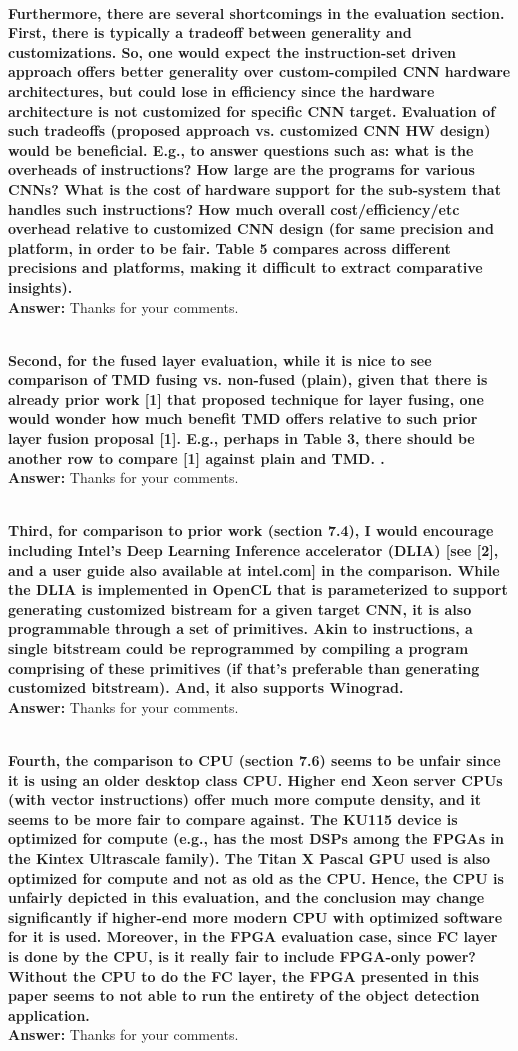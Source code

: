 \documentclass[12pt]{paper}
\newcommand{\rev}[1]{{{\color[rgb]{0,0,1}{#1}}}}
\newcommand{\answer}[1]{\noindent\textbf{Answer:} #1}
\newcommand{\comment}[1]{\noindent\textbf{\\ #1}\\}
\begin{document}
\comment{Furthermore, there are several shortcomings in the evaluation section. \\
First, there is typically a tradeoff between generality and customizations. So, one would expect the instruction-set driven approach offers better generality over custom-compiled CNN hardware architectures, but could lose in efficiency since the hardware architecture is not customized for specific CNN target. Evaluation of such tradeoffs (proposed approach vs. customized CNN HW design) would be beneficial. E.g., to answer questions such as: what is the overheads of instructions? How large are the programs for various CNNs? What is the cost of hardware support for the sub-system that handles such instructions? How much overall cost/efficiency/etc overhead relative to customized CNN design (for same precision and platform, in order to be fair. Table 5 compares across different precisions and platforms, making it difficult to extract comparative insights). 
}
\answer{Thanks for your comments.}
\rev{We have corrected this error.}

\comment{Second, for the fused layer evaluation, while it is nice to see comparison of TMD fusing vs. non-fused (plain), given that there is already prior work [1] that proposed technique for layer fusing, one would wonder how much benefit TMD offers relative to such prior layer fusion proposal [1]. E.g., perhaps in Table 3, there should be another row to compare [1] against plain and TMD. . 
}
\answer{Thanks for your comments.}
\rev{We have corrected this error.}

\comment{Third, for comparison to prior work (section 7.4), I would encourage including Intel’s Deep Learning Inference accelerator (DLIA) [see [2], and a user guide also available at intel.com] in the comparison. While the DLIA is implemented in OpenCL that is parameterized to support generating customized bistream for a given target CNN, it is also programmable through a set of primitives. Akin to instructions, a single bitstream could be reprogrammed by compiling a program comprising of these primitives (if that’s preferable than generating customized bitstream). And, it also supports Winograd. 
}
\answer{Thanks for your comments.}
\rev{We have corrected this error.}

\comment{Fourth, the comparison to CPU (section 7.6) seems to be unfair since it is using an older desktop class CPU. Higher end Xeon server CPUs (with vector instructions) offer much more compute density, and it seems to be more fair to compare against. The KU115 device is optimized for compute (e.g., has the most DSPs among the FPGAs in the Kintex Ultrascale family). The Titan X Pascal GPU used is also optimized for compute and not as old as the CPU. Hence, the CPU is unfairly depicted in this evaluation, and the conclusion may change significantly if higher-end more modern CPU with optimized software for it is used. Moreover, in the FPGA evaluation case, since FC layer is done by the CPU, is it really fair to include FPGA-only power? Without the CPU to do the FC layer, the FPGA presented in this paper seems to not able to run the entirety of the object detection application. 
}
\answer{Thanks for your comments.}
\rev{We have corrected this error.}
\end{document}
